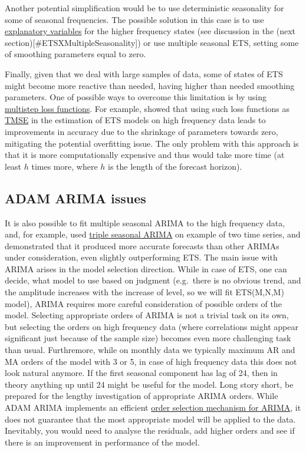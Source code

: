 \documentclass[
]{book}
\theoremstyle{definition}
\theoremstyle{definition}
\theoremstyle{definition}
\theoremstyle{definition}
\theoremstyle{remark}
\begin{document}
Another potential simplification would be to use deterministic seasonality for some of seasonal frequencies. The possible solution in this case is to use \protect\hyperlink{ADAMX}{explanatory variables} for the higher frequency states (see discussion in the (next section){[}\#ETSXMultipleSeasonality{]}) or use multiple seasonal ETS, setting some of smoothing parameters equal to zero.

Finally, given that we deal with large samples of data, some of states of ETS might become more reactive than needed, having higher than needed smoothing parameters. One of possible ways to overcome this limitation is by using \protect\hyperlink{multistepLosses}{multistep loss functions}. For example, \citet{kourentzes2018smoothing} showed that using such loss functions as \protect\hyperlink{multistepLossesTMSE}{TMSE} in the estimation of ETS models on high frequency data leads to improvements in accuracy due to the shrinkage of parameters towards zero, mitigating the potential overfitting issue. The only problem with this approach is that it is more computationally expensive and thus would take more time (at least \(h\) times more, where \(h\) is the length of the forecast horizon).

\hypertarget{adam-arima-issues}{%
\subsection{ADAM ARIMA issues}\label{adam-arima-issues}}

It is also possible to fit multiple seasonal ARIMA to the high frequency data, and, for example, \citet{Taylor2010} used \protect\hyperlink{MSARIMA}{triple seasonal ARIMA} on example of two time series, and demonstrated that it produced more accurate forecasts than other ARIMAs under consideration, even slightly outperforming ETS. The main issue with ARIMA arises in the model selection direction. While in case of ETS, one can decide, what model to use based on judgment (e.g.~there is no obvious trend, and the amplitude increases with the increase of level, so we will fit ETS(M,N,M) model), ARIMA requires more careful consideration of possible orders of the model. Selecting appropriate orders of ARIMA is not a trivial task on its own, but selecting the orders on high frequency data (where correlations might appear significant just because of the sample size) becomes even more challenging task than usual. Furthremore, while on monthly data we typically maximum AR and MA orders of the model with 3 or 5, in case of high frequency data this does not look natural anymore. If the first seasonal component has lag of 24, then in theory anything up until 24 might be useful for the model. Long story short, be prepared for the lengthy investigation of appropriate ARIMA orders. While ADAM ARIMA implements an efficient \protect\hyperlink{ARIMASelection}{order selection mechanism for ARIMA}, it does not guarantee that the most appropriate model will be applied to the data. Inevitably, you would need to analyse the residuals, add higher orders and see if there is an improvement in performance of the model.
\end{document}
